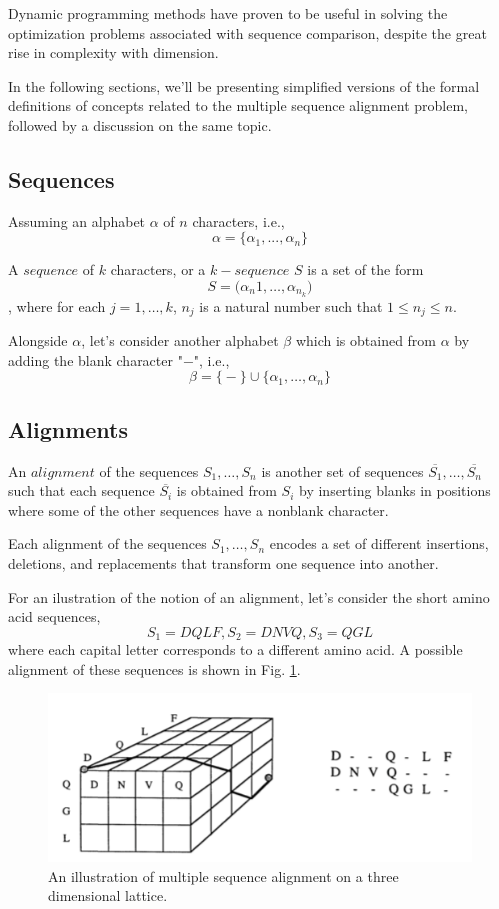 \documentclass[11pt]{article}
\begin{document}
Dynamic programming methods have proven to be useful in solving the optimization problems associated with sequence comparison, despite the great rise in complexity with dimension. 

In the following sections, we'll be presenting simplified versions of the formal definitions of concepts related to the multiple sequence alignment problem, followed by a discussion on the same topic.

\subsection{Sequences}

Assuming an alphabet $\alpha$ of $n$ characters, i.e.,  $$\alpha = \big\{ \alpha_1, ... , \alpha_n \big\}$$

A $sequence$ of $k$ characters, or a $k-sequence$ $S$ is a set of the form $$S = \big( \alpha_n1, \dots , \alpha_n_k \big)$$, where for each $j = 1, \dots  , k$, $n_j$ is a natural number such that $1 \leq n_j \leq n$.

Alongside $\alpha$, let's consider another alphabet $\beta$ which is obtained from $\alpha$ by adding the blank character "$-$", i.e., $$\beta = \big\{ - \big\} \cup \big\{ \alpha_1, \dots , \alpha_n \big\}$$

\subsection{Alignments}

An $alignment$ of the sequences $S_1, \dots , S_n$ is another set of sequences $\overline{S_1}, \dots, \overline{S_n}$ such that each sequence $\overline{S_i}$ is obtained from $S_i$ by inserting blanks in positions where some of the other sequences have a nonblank character.

Each alignment of the sequences $S_1, \dots , S_n$ encodes a set of different insertions, deletions, and replacements that transform one sequence into another. 

For an ilustration of the notion of an alignment, let's consider the short amino acid sequences, $$S_1 = DQLF, S_2=DNVQ, S_3=QGL$$ where each capital letter corresponds to a different amino acid. A possible alignment of these sequences is shown in Fig. \ref{fig:alignment}.

\begin{figure}
    \centering
    \includegraphics[scale=0.5]{alignment-example.png}
    \caption{An illustration of multiple sequence alignment on a three dimensional lattice.}
    \label{fig:alignment}
\end{figure}
\end{document}
